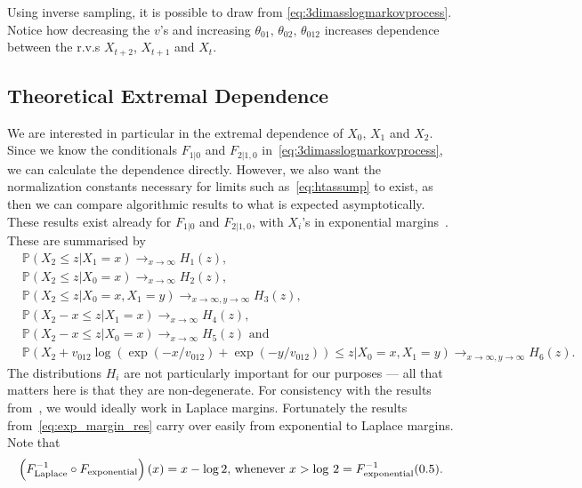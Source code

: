 \documentclass[11pt,twoside,openany]{book}
\newcommand{\prob}{\mathbb{P}}
\newcommand{\ra}{\rightarrow}
\numberwithin{Theorem}{chapter}
\numberwithin{Definition}{chapter}
\numberwithin{Lemma}{chapter}
\numberwithin{Algorithm}{chapter}
\numberwithin{equation}{chapter}
\begin{document}
Using inverse sampling, it is possible to draw from
\eqref{eq:3dimasslogmarkovprocess}. Notice how
decreasing the $v$'s and increasing $\theta_{01},\,\theta_{02},\,\theta_{012}$
increases dependence between the r.v.s $X_{t+2}$, $X_{t+1}$ and $X_{t}$.

\clearpage

\subsection{Theoretical Extremal Dependence}

We are interested in particular in the extremal dependence of
$X_0,\,X_1$ and $X_2$. Since we know the conditionals $F_{1|0}$ and
$F_{2|1,0}$ in~\eqref{eq:3dimasslogmarkovprocess}, we can calculate the
dependence directly. However, we also want the normalization constants
necessary for limits such as~\eqref{eq:htassump} to exist, as then we
can compare algorithmic results to what is expected asymptotically.
These results exist already for $F_{1|0}$ and $F_{2|1,0}$, with $X_i$'s in exponential
margins~\citep{papastathopoulos2017extreme,https://doi.org/10.48550/arxiv.1903.04059}.
These are summarised by
\begin{equation}\label{eq:exp_margin_res}
    \begin{split}
      &\prob(X_2 \leq z | X_1 = x) \ra_{x\ra\infty} H_1(z),\\
      &\prob(X_2 \leq z | X_0 = x) \ra_{x\ra\infty} H_2(z),\\
      &\prob(X_2 \leq z | X_0 = x, X_1 = y) \ra_{x\ra\infty,y\ra\infty} H_3(z),\\
      &\prob(X_2 - x \leq z | X_1 = x) \ra_{x\ra\infty} H_4(z),\\
      &\prob(X_2 - x \leq z | X_0 = x) \ra_{x\ra\infty} H_5(z)\text{ and }\\
      &\prob(X_2 +v_{012}\log(\exp(-x/v_{012})+\exp(-y/v_{012}))\leq z | X_0 = x,
      X_1 = y) \ra_{x\ra\infty,y\ra\infty} H_6(z).
    \end{split}
  \end{equation}
The distributions $H_i$ are not particularly important for our purposes --- all
that matters here is that they are
non-degenerate.
For consistency with the results from~\cite{keef2013estimation}, we would ideally work in Laplace margins. Fortunately
the results from~\eqref{eq:exp_margin_res} carry over easily from exponential to Laplace
margins. Note that
\begin{equation}\label{eq:exp_to_lap_res}
    \left(F_{\text{Laplace}}^{-1}\circ F_{\text{exponential}}\right) (x)=
    x - \log 2\text{, whenever $x > \log\,2=F_{\text{exponential}}^{-1}(0.5)$}.\\
  \end{equation}
\end{document}
